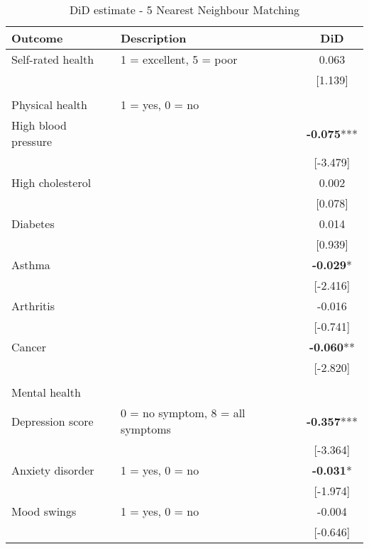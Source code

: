 \begin{table}[h!]
        \caption{DiD estimate - 5 Nearest Neighbour Matching}
        \label{app:did_matching_5nn}
        \begin{tabular}{llc}
            \toprule
            Outcome & Description & DiD \\
            \midrule
            Self-rated health & 1 = excellent, 5 = poor & 0.063 \\
            &  & [1.139] \\
            & & \\
            Physical health & 1 = yes, 0 = no & \\
            High blood pressure &  & \textbf{-0.075}*** \\
            &  & [-3.479] \\
            High cholesterol &  & 0.002 \\
            &  & [0.078] \\
            Diabetes &  & 0.014 \\
            &  & [0.939] \\
            Asthma &  & \textbf{-0.029}* \\
            &  & [-2.416] \\
            Arthritis &  & -0.016 \\
            &  & [-0.741] \\
            Cancer &  & \textbf{-0.060}** \\
            &  & [-2.820] \\
            & & \\
            Mental health & & \\
            Depression score & 0 = no symptom, 8 = all symptoms & \textbf{-0.357}*** \\
            &  & [-3.364] \\
            Anxiety disorder & 1 = yes, 0 = no & \textbf{-0.031}* \\
            &  & [-1.974] \\
            Mood swings & 1 = yes, 0 = no & -0.004 \\
            &  & [-0.646] \\
            \bottomrule
        \end{tabular}
\end{table}